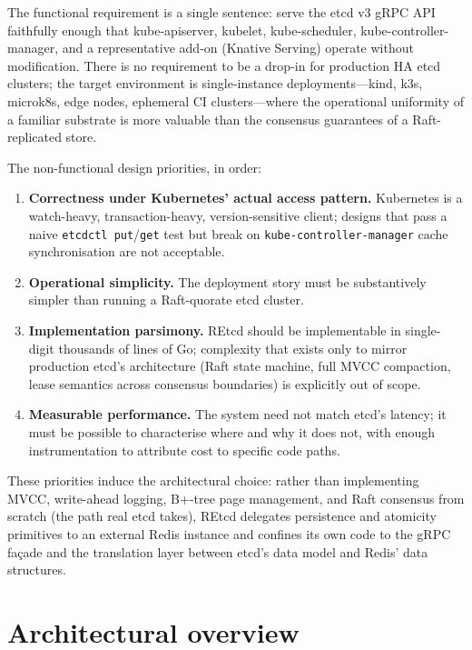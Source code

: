 The functional requirement is a single sentence: serve the etcd v3 gRPC API faithfully enough that kube-apiserver, kubelet, kube-scheduler, kube-controller-manager, and a representative add-on (Knative Serving) operate without modification. There is no requirement to be a drop-in for production HA etcd clusters; the target environment is single-instance deployments---kind, k3s, microk8s, edge nodes, ephemeral CI clusters---where the operational uniformity of a familiar substrate is more valuable than the consensus guarantees of a Raft-replicated store.

The non-functional design priorities, in order:

\begin{enumerate}
    \item \textbf{Correctness under Kubernetes' actual access pattern.} Kubernetes is a watch-heavy, transaction-heavy, version-sensitive client; designs that pass a naive \texttt{etcdctl put}/\texttt{get} test but break on \texttt{kube-controller-manager} cache synchronisation are not acceptable.
    \item \textbf{Operational simplicity.} The deployment story must be substantively simpler than running a Raft-quorate etcd cluster.
    \item \textbf{Implementation parsimony.} REtcd should be implementable in single-digit thousands of lines of Go; complexity that exists only to mirror production etcd's architecture (Raft state machine, full MVCC compaction, lease semantics across consensus boundaries) is explicitly out of scope.
    \item \textbf{Measurable performance.} The system need not match etcd's latency; it must be possible to characterise where and why it does not, with enough instrumentation to attribute cost to specific code paths.
\end{enumerate}

These priorities induce the architectural choice: rather than implementing MVCC, write-ahead logging, B+-tree page management, and Raft consensus from scratch (the path real etcd takes), REtcd delegates persistence and atomicity primitives to an external Redis instance and confines its own code to the gRPC fa\c{c}ade and the translation layer between etcd's data model and Redis' data structures.

\section{Architectural overview}
\label{sec:design-arch}

